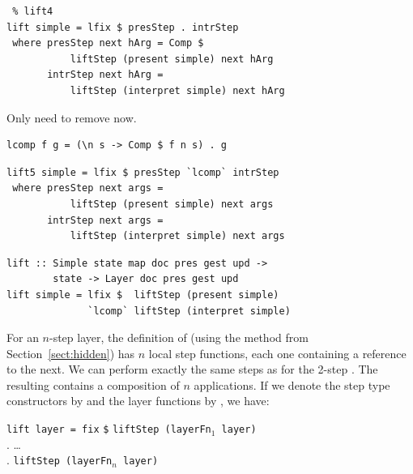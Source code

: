 \documentclass[preprint,natbib]{sigplanconf}
\begin{document}
\begin{small}
\begin{verbatim} % lift4
lift simple = lfix $ presStep . intrStep
 where presStep next hArg = Comp $
           liftStep (present simple) next hArg
       intrStep next hArg = 
           liftStep (interpret simple) next hArg
\end{verbatim}
\end{small}


Only need to remove  now. 

\begin{small}
\begin{verbatim}
lcomp f g = (\n s -> Comp $ f n s) . g
\end{verbatim}%
\end{small}

\begin{small} %
\begin{verbatim}
lift5 simple = lfix $ presStep `lcomp` intrStep
 where presStep next args = 
           liftStep (present simple) next args
       intrStep next args = 
           liftStep (interpret simple) next args
\end{verbatim}%
\end{small}


\begin{small} %
\begin{verbatim}
lift :: Simple state map doc pres gest upd ->
        state -> Layer doc pres gest upd
lift simple = lfix $  liftStep (present simple) 
              `lcomp` liftStep (interpret simple) 
\end{verbatim}%
\end{small}



For an $n$-step layer, the definition of  (using the method from Section~\ref{sect:hidden}) has $n$ local step functions, each one containing a reference to the next. \bc {} \ec We can perform exactly the same steps as for the 2-step . The resulting  contains a composition of $n$  applications. If we denote the step type constructors by  and the layer functions by , we have:

\begin{small}
\begin{tabbing}
{\tt lift layer = fix} \= {\tt \$} \= {\tt liftStep (layerFn$_1$ layer)} \\
                       \> .        \> \dots\ \\
                       \> .        \> {\tt liftStep (layerFn$_n$ layer)}\\
\end{tabbing}%
\end{small}
\end{document}
